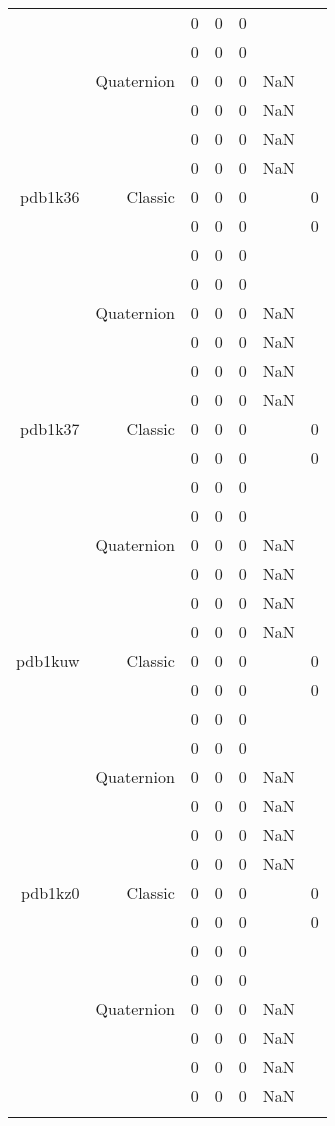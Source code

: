\begin{xltabular}{\textwidth}{r|rcccSc}
& & 0 & 0 & 0 & & \\
& & 0 & 0 & 0 & & \\
& Quaternion & 0 & 0 & 0 & NaN & \\
& & 0 & 0 & 0 & NaN & \\
& & 0 & 0 & 0 & NaN & \\
& & 0 & 0 & 0 & NaN & \\ \addlinespace
pdb1k36 & Classic & 0 & 0 & 0 & & 0 \\
& & 0 & 0 & 0 & & 0 \\
& & 0 & 0 & 0 & & \\
& & 0 & 0 & 0 & & \\
& Quaternion & 0 & 0 & 0 & NaN & \\
& & 0 & 0 & 0 & NaN & \\
& & 0 & 0 & 0 & NaN & \\
& & 0 & 0 & 0 & NaN & \\ \addlinespace
pdb1k37 & Classic & 0 & 0 & 0 & & 0 \\
& & 0 & 0 & 0 & & 0 \\
& & 0 & 0 & 0 & & \\
& & 0 & 0 & 0 & & \\
& Quaternion & 0 & 0 & 0 & NaN & \\
& & 0 & 0 & 0 & NaN & \\
& & 0 & 0 & 0 & NaN & \\
& & 0 & 0 & 0 & NaN & \\ \addlinespace
pdb1kuw & Classic & 0 & 0 & 0 & & 0 \\
& & 0 & 0 & 0 & & 0 \\
& & 0 & 0 & 0 & & \\
& & 0 & 0 & 0 & & \\
& Quaternion & 0 & 0 & 0 & NaN & \\
& & 0 & 0 & 0 & NaN & \\
& & 0 & 0 & 0 & NaN & \\
& & 0 & 0 & 0 & NaN & \\ \addlinespace
pdb1kz0 & Classic & 0 & 0 & 0 & & 0 \\
& & 0 & 0 & 0 & & 0 \\
& & 0 & 0 & 0 & & \\
& & 0 & 0 & 0 & & \\
& Quaternion & 0 & 0 & 0 & NaN & \\
& & 0 & 0 & 0 & NaN & \\
& & 0 & 0 & 0 & NaN & \\
& & 0 & 0 & 0 & NaN & \\ \addlinespace

\end{xltabular}
